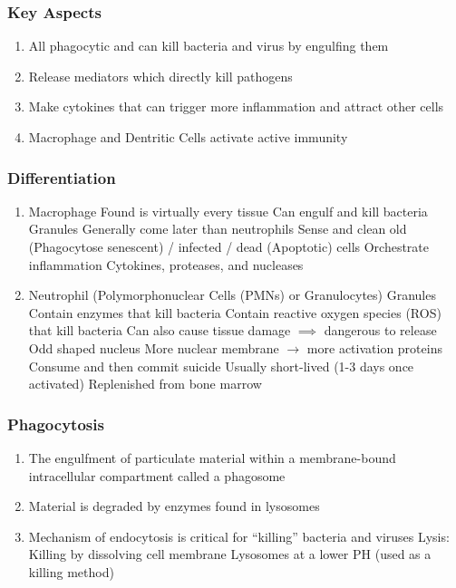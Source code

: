\documentclass{notes}
\begin{document}
\subsubsection*{Key Aspects}
\begin{enumerate}
    \item All phagocytic and can kill bacteria and virus by engulfing them
    \item Release mediators which directly kill pathogens
    \item Make cytokines that can trigger more inflammation and attract other cells
    \item Macrophage and Dentritic Cells activate active immunity
\end{enumerate}
\subsubsection*{Differentiation}
\begin{enumerate}
    \item Macrophage
          \subitem Found is virtually every tissue
          \subsubitem Can engulf and kill bacteria
          \subitem Granules
          \subitem Generally come later than neutrophils
          \subsubitem Sense and clean old (Phagocytose senescent) / infected / dead (Apoptotic) cells
          \subitem Orchestrate inflammation
          \subsubitem Cytokines, proteases, and nucleases
    \item Neutrophil (Polymorphonuclear Cells (PMNs) or Granulocytes)
          \subitem Granules
          \subsubitem Contain enzymes that kill bacteria
          \subsubitem Contain reactive oxygen species (ROS) that kill bacteria
          \subsubitem Can also cause tissue damage \(\implies\) dangerous to release
          \subitem Odd shaped nucleus
          \subsubitem More nuclear membrane \(\rightarrow\) more activation proteins
          \subitem Consume and then commit suicide
          \subsubitem Usually short-lived (1-3 days once activated)
          \subsubitem Replenished from bone marrow
\end{enumerate}

\subsubsection*{Phagocytosis}
\begin{enumerate}
    \item The engulfment of particulate material within a membrane-bound intracellular compartment called a phagosome
    \item Material is degraded by enzymes found in lysosomes
    \item Mechanism of endocytosis is critical for ``killing'' bacteria and viruses
          \subitem Lysis: Killing by dissolving cell membrane
          \subitem Lysosomes at a lower PH (used as a killing method)
\end{enumerate}
\end{document}
